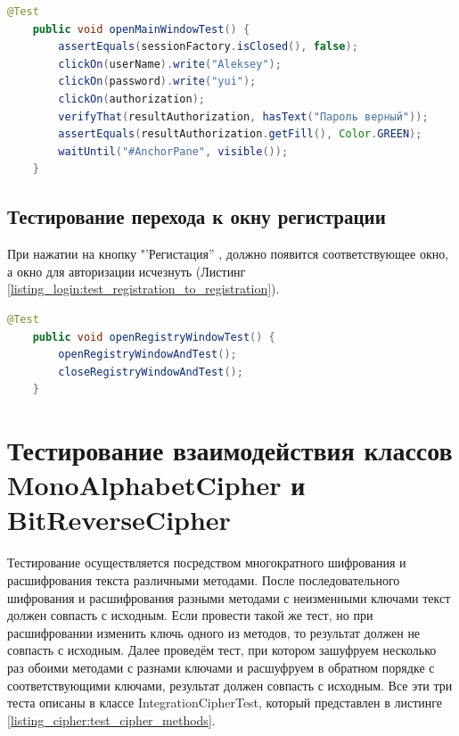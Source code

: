 \documentclass[a4paper,12pt]{article}
\begin{document}
\begin{lstlisting}[language=java, caption=Тестирование ввода неверного пароля, label=listing_login:test_true_autorization]
    @Test
    public void openMainWindowTest() {
        assertEquals(sessionFactory.isClosed(), false);
        clickOn(userName).write("Aleksey");
        clickOn(password).write("yui");
        clickOn(authorization);
        verifyThat(resultAuthorization, hasText("Пароль верный"));
        assertEquals(resultAuthorization.getFill(), Color.GREEN);
        waitUntil("#AnchorPane", visible());
    }
\end{lstlisting}

\subsection{Тестирование перехода к окну регистрации}
При нажатии на кнопку "'Регистация'' , должно появится соответствующее окно, а окно для авторизации исчезнуть (Листинг \ref{listing_login:test_registration_to_registration}). 
\begin{lstlisting}[language=java, caption=Тестирование перехода к окну регистрации, label=listing_login:test_registration_to_registration]
    @Test
    public void openRegistryWindowTest() {
        openRegistryWindowAndTest();
        closeRegistryWindowAndTest();
    }
\end{lstlisting}

\newpage\section{Тестирование взаимодействия классов \\MonoAlphabetCipher и BitReverseCipher}
Тестирование осуществляется посредством многократного шифрования и расшифрования текста различными методами. После последовательного шифрования и расшифрования разными методами с неизменными ключами текст должен совпасть с исходным. Если провести такой же тест, но при расшифровании изменить ключь одного из методов, то результат должен не совпасть с исходным. Далее проведём тест, при котором зашуфруем несколько раз обоими методами с разнами ключами и расшуфруем в обратном порядке с соответствующими ключами, результат должен совпасть с исходным. Все эти три теста описаны в классе IntegrationCipherTest, который представлен в листинге \ref{listing_cipher:test_cipher_methods}.
\end{document}
